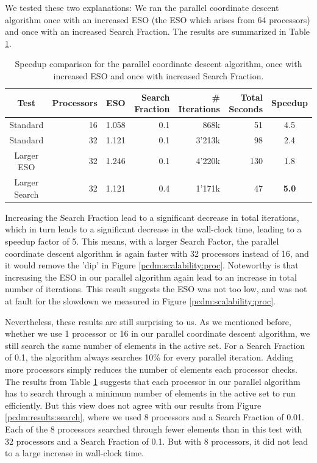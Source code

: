We tested these two explanations: We ran the parallel coordinate descent algorithm once with an increased ESO (the ESO which arises from 64 processors) and once with an increased Search Fraction. The results are summarized in Table \ref{pcdm:scalability:table}.

\begin{table} [h]
	\centering
	\begin{tabular}{c | r | r | r | r | r | c}
		Test & Processors &  ESO & Search Fraction & \# Iterations & Total Seconds & Speedup\\ \hline \hline
		Standard & 16 & 1.058 & 0.1 &  868k & 51 & 4.5\\\hline
		Standard & 32 & 1.121 & 0.1 & 3'213k & 98 & 2.4\\
		Larger ESO & 32 &  1.246 & 0.1 & 4'220k & 130 & 1.8 \\
		Larger Search & 32 &  1.121 & 0.4 & 1'171k & 47 & \textbf{5.0} \\
	\end{tabular}
	\caption{Speedup comparison for the parallel coordinate descent algorithm, once with increased ESO and once with increased Search Fraction.}
	\label{pcdm:scalability:table}
\end{table}

Increasing the Search Fraction lead to a significant decrease in total iterations, which in turn leads to a significant decrease in the wall-clock time, leading to a speedup factor of 5. This means, with a larger Search Factor, the parallel coordinate descent algorithm is again faster with 32 processors instead of 16, and it would remove the 'dip' in Figure \ref{pcdm:scalability:proc}. Noteworthy is that increasing the ESO in our parallel algorithm again lead to an increase in total number of iterations. This result suggests the ESO was not too low, and was not at fault for the slowdown we measured in Figure \ref{pcdm:scalability:proc}. 

Nevertheless, these results are still surprising to us. As we mentioned before, whether we use 1 processor or 16 in our parallel coordinate descent algorithm, we still search the same number of elements in the active set. For a Search Fraction of 0.1, the algorithm always searches 10\% for every parallel iteration. Adding more processors simply reduces the number of elements each processor checks. The results from Table \ref{pcdm:scalability:table} suggests that each processor in our parallel algorithm has to search through a minimum number of elements in the active set to run efficiently. But this view does not agree with our results from Figure \ref{pcdm:results:search}, where we used 8 processors and a Search Fraction of 0.01. Each of the 8 processors searched through fewer elements than in this test with 32 processors and a Search Fraction of 0.1. But with 8 processors, it did not lead to a large increase in wall-clock time.

